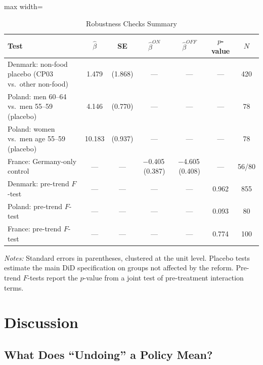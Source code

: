\documentclass[12pt]{article}
\begin{document}
\begin{table}[H]
\centering
\caption{Robustness Checks Summary}
\label{tab:robustness}
\begin{adjustbox}{max width=\textwidth}
\begin{tabular}{lcccccc}
\toprule
Test & $\hat{\beta}$ & SE & $\hat{\beta}^{ON}$ & $\hat{\beta}^{OFF}$ & $p$-value & $N$ \\
\midrule
Denmark: non-food placebo (CP03 vs.\ other non-food) & 1.479 & (1.868) & --- & --- & --- & 420 \\
Poland: men 60--64 vs.\ men 55--59 (placebo) & 4.146 & (0.770) & --- & --- & --- & 78 \\
Poland: women vs.\ men age 55--59 (placebo) & 10.183 & (0.937) & --- & --- & --- & 78 \\
France: Germany-only control & --- & --- & $-$0.405\,(0.387) & $-$4.605\,(0.408) & --- & 56/80 \\
Denmark: pre-trend $F$-test & --- & --- & --- & --- & 0.962 & 855 \\
Poland: pre-trend $F$-test & --- & --- & --- & --- & 0.093 & 80 \\
France: pre-trend $F$-test & --- & --- & --- & --- & 0.774 & 100 \\
\bottomrule
\end{tabular}
\end{adjustbox}
\par\vspace{0.3em}
{\small \textit{Notes:} Standard errors in parentheses, clustered at the unit level. Placebo tests estimate the main DiD specification on groups not affected by the reform. Pre-trend $F$-tests report the $p$-value from a joint test of pre-treatment interaction terms.}
\end{table}


\section{Discussion}
\label{sec:discussion}

\subsection{What Does ``Undoing'' a Policy Mean?}
\end{document}
